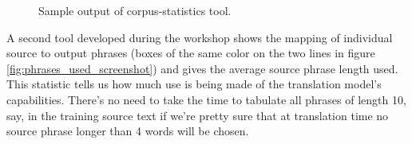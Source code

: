 \documentclass[11pt]{report}
\theoremstyle{plain}
\begin{document}
{\begin{figure}[h]
\centering
\caption{Sample output of corpus-statistics tool.}
\label{fig:sentence_by_sentence_screenshot}
 \newline
{}
\end{figure}

A second tool developed during the workshop shows the mapping of individual source to output phrases (boxes of the same color on the two lines in figure \ref{fig:phrases_used_screenshot}) and gives the average source phrase length used. This statistic tells us how much use is being made of the translation model's capabilities. There's no need to take the time to tabulate all phrases of length 10, say, in the training source text if we're pretty sure that at translation time no source phrase longer than 4 words will be chosen.

}
\end{document}
